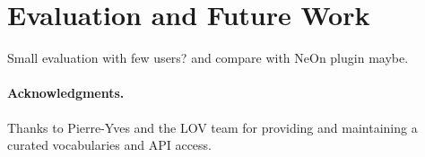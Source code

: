 \documentclass[runningheads,a4paper]{llncs}
\begin{document}

\section{Evaluation and Future Work}
\label{sec:conclusion}
Small evaluation with few users? and compare with NeOn plugin maybe.



\paragraph{\textbf{Acknowledgments.}} %
Thanks to Pierre-Yves and the LOV team for providing and maintaining a curated vocabularies and API access.


\nocite{*}

\end{document}

